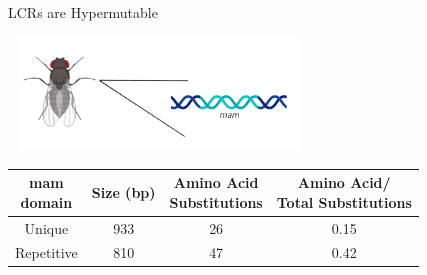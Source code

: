 \documentclass{beamer}
\begin{document}
	\begin{frame}{LCRs are Hypermutable }
		
		
		\begin{center}	
		\includegraphics[width=8cm, height=3cm]{drosophila.png}
		\end{center}
	
		\begin{center}	
		\begin{tabular}{|cccc|}
			\hline
			\makecell{\textbf{mam} \\ \textbf{domain}} & \textbf{Size (bp)} & \makecell{\textbf{Amino Acid} \\ \textbf{Substitutions}} & \makecell{\textbf{Amino Acid/} \\ \textbf{Total Substitutions}}  \\ 
			\hline
			Unique & 933 & 26 & 0.15\\ 
			\hline
			Repetitive & 810 & 47 & 0.42\\ 
			\hline
		\end{tabular}\newline\newline
		\end{center}
	
	\tiny\cite{newfeld1991interspecific}
	\end{frame}
\end{document}
